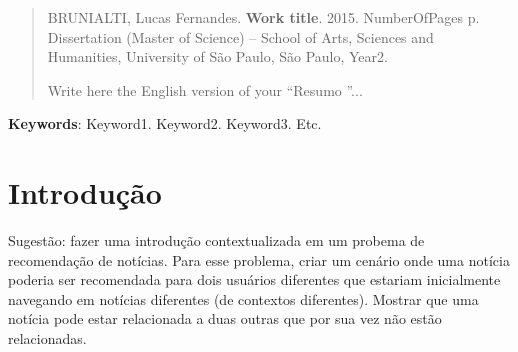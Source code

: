 \documentclass[normaltoc, espacoumemeio, pnumromarab,ruledheader]{abnt}
\begin{document}
%
%
%
%


\begin{abstract}
\begin{flushleft}
\noindent BRUNIALTI, Lucas Fernandes. \textbf{Work title}. 2015. NumberOfPages p. Dissertation (Master of Science) -- School of Arts, Sciences and Humanities, University of São Paulo, São Paulo, Year2.
\newline
\end{flushleft}


\noindent Write here the English version of your \textquotedblleft Resumo \textquotedblright...
\end{abstract}

\par
\vspace{2em}
\noindent \textbf{Keywords}: Keyword1. Keyword2. Keyword3. Etc.

\listoffigures

\listoftables



\tableofcontents


\chapter{Introdução}
\label{intro}



Sugestão: fazer uma introdução contextualizada em um probema de recomendação de notícias. Para esse problema, criar um cenário onde uma notícia poderia ser recomendada para dois usuários diferentes que estariam inicialmente navegando em notícias diferentes (de contextos diferentes). Mostrar que uma notícia pode estar relacionada a duas outras que por sua vez não estão relacionadas.
\end{document}

